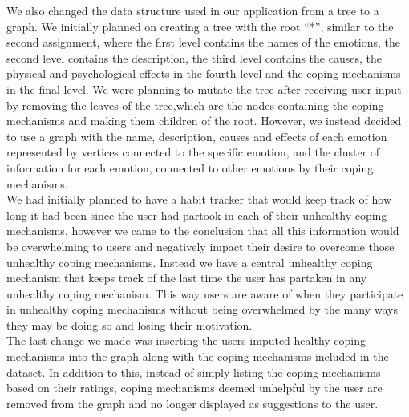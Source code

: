 \documentclass{article}
\begin{document}
    We also changed the data structure used in our application from a tree to a graph. We initially planned on creating a tree with the root “*”, similar to the second assignment, where the first level contains the names of the emotions, the second level contains the description, the third level contains the causes, the physical and psychological effects in the fourth level and the coping mechanisms in the final level. We were planning to mutate the tree after receiving user input by removing the leaves of the tree,which are the nodes containing the coping mechanisms and making them children of the root. However, we instead decided to use a graph with the name, description, causes and effects of each emotion represented by vertices connected to the specific emotion, and the cluster of information for each emotion, connected to other emotions by their coping mechanisms. \\

    We had initially planned to have a habit tracker that would keep track of how long it had been since the user had partook in each of their unhealthy coping mechanisms, however we came to the conclusion that all this information would be overwhelming to users and negatively impact their desire to overcome those unhealthy coping mechanisms. Instead we have a central unhealthy coping mechanism that keeps track of the last time the user has partaken in any unhealthy coping mechanism. This way users are aware of when they participate in unhealthy coping mechanisms without being overwhelmed by the many ways they may be doing so and losing their motivation. \\

    The last change we made was inserting the users imputed healthy coping mechanisms into the graph along with the coping mechanisms included in the dataset. In addition to this, instead of simply listing the coping mechanisms based on their ratings, coping mechanisms deemed unhelpful by the user are removed from the graph and no longer displayed as suggestions to the user.\\
\end{document}
